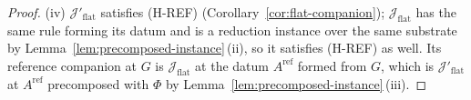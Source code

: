 \begin{proof}
(iv) $\mathcal{J}'_{\mathrm{flat}}$ satisfies (H-REF)
(Corollary~\ref{cor:flat-companion}); $\mathcal{J}_{\mathrm{flat}}$ has the
same rule forming its datum and is a reduction instance over the same
substrate by Lemma~\ref{lem:precomposed-instance}\,(ii), so it satisfies
(H-REF) as well. Its reference companion at $G$ is
$\mathcal{J}_{\mathrm{flat}}$ at the datum $A^{\mathrm{ref}}$ formed from
$G$, which is $\mathcal{J}'_{\mathrm{flat}}$ at $A^{\mathrm{ref}}$
precomposed with $\Phi$ by Lemma~\ref{lem:precomposed-instance}\,(iii).
\end{proof}
